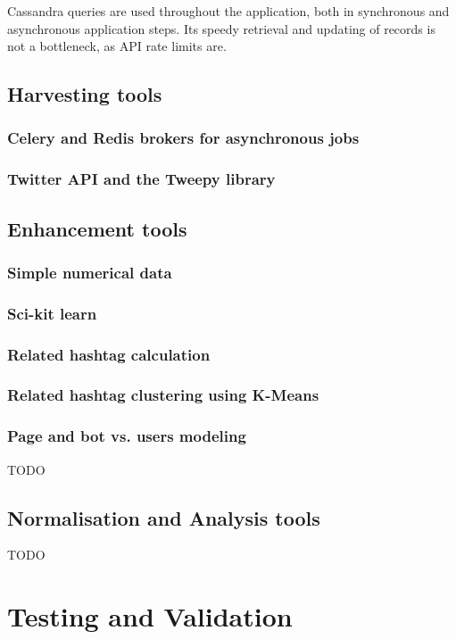 \documentclass[12pt,a4paper,twoside]{report}
\begin{document}
Cassandra queries are used throughout the application, both in synchronous and asynchronous application steps. Its speedy retrieval and updating of records is not a bottleneck, as API rate limits are.

\section{Harvesting tools}
\subsection{Celery and Redis brokers for asynchronous jobs}
\subsection{Twitter API and the Tweepy library}

\section{Enhancement tools}
\subsection{Simple numerical data}
\subsection{Sci-kit learn}
\subsection{Related hashtag calculation}
\subsection{Related hashtag clustering using K-Means}
\subsection{Page and bot vs. users modeling}
{\color{red} TODO
}

\section{Normalisation and Analysis tools}
{\color{red} TODO
}

\chapter{Testing and Validation}
\end{document}
